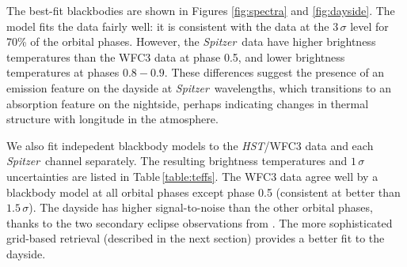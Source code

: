 \documentclass[twocolumn, trackchanges]{aastex61}
\newcommand{\project}[1]{\textsl{#1}}
\newcommand{\HST}{\project{HST}}
\newcommand{\Spitzer}{\project{Spitzer}}
\begin{document}
The best-fit blackbodies are shown in Figures \ref{fig:spectra} and \ref{fig:dayside}. The model fits the data fairly well: it is consistent with the data at the $3\,\sigma$ level for 70\% of the orbital phases. However, the \Spitzer\ data have higher brightness temperatures than the WFC3 data at phase 0.5, and lower brightness temperatures at phases $0.8 - 0.9$. These differences suggest the presence of an emission feature on the dayside at \Spitzer\ wavelengths, which transitions to an absorption feature on the nightside, perhaps indicating changes in thermal structure with longitude in the atmosphere.

We also fit indepedent blackbody models to the \HST/WFC3 data and each \Spitzer\ channel separately. The resulting brightness temperatures and $1\,\sigma$ uncertainties are listed in Table\,\ref{table:teffs}. The WFC3 data agree well by a blackbody model at all orbital phases except phase 0.5 (consistent at better than $1.5\,\sigma$). The dayside has higher signal-to-noise than the other orbital phases, thanks to the two secondary eclipse observations from \cite{cartier17}. The more sophisticated grid-based retrieval (described in the next section) provides a better fit to the dayside.



\end{document}
